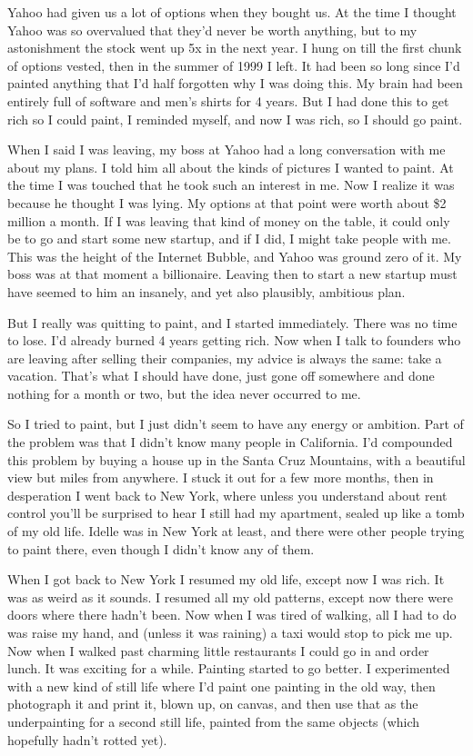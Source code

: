 Yahoo had given us a lot of options when they bought us. At the time I
thought Yahoo was so overvalued that they'd never be worth anything, but
to my astonishment the stock went up 5x in the next year. I hung on till
the first chunk of options vested, then in the summer of 1999 I left. It
had been so long since I'd painted anything that I'd half forgotten why
I was doing this. My brain had been entirely full of software and men's
shirts for 4 years. But I had done this to get rich so I could paint, I
reminded myself, and now I was rich, so I should go paint.

When I said I was leaving, my boss at Yahoo had a long conversation with
me about my plans. I told him all about the kinds of pictures I wanted
to paint. At the time I was touched that he took such an interest in me.
Now I realize it was because he thought I was lying. My options at that
point were worth about \$2 million a month. If I was leaving that kind
of money on the table, it could only be to go and start some new
startup, and if I did, I might take people with me. This was the height
of the Internet Bubble, and Yahoo was ground zero of it. My boss was at
that moment a billionaire. Leaving then to start a new startup must have
seemed to him an insanely, and yet also plausibly, ambitious plan.

But I really was quitting to paint, and I started immediately. There was
no time to lose. I'd already burned 4 years getting rich. Now when I
talk to founders who are leaving after selling their companies, my
advice is always the same: take a vacation. That's what I should have
done, just gone off somewhere and done nothing for a month or two, but
the idea never occurred to me.

So I tried to paint, but I just didn't seem to have any energy or
ambition. Part of the problem was that I didn't know many people in
California. I'd compounded this problem by buying a house up in the
Santa Cruz Mountains, with a beautiful view but miles from anywhere. I
stuck it out for a few more months, then in desperation I went back to
New York, where unless you understand about rent control you'll be
surprised to hear I still had my apartment, sealed up like a tomb of my
old life. Idelle was in New York at least, and there were other people
trying to paint there, even though I didn't know any of them.

When I got back to New York I resumed my old life, except now I was
rich. It was as weird as it sounds. I resumed all my old patterns,
except now there were doors where there hadn't been. Now when I was
tired of walking, all I had to do was raise my hand, and (unless it was
raining) a taxi would stop to pick me up. Now when I walked past
charming little restaurants I could go in and order lunch. It was
exciting for a while. Painting started to go better. I experimented with
a new kind of still life where I'd paint one painting in the old way,
then photograph it and print it, blown up, on canvas, and then use that
as the underpainting for a second still life, painted from the same
objects (which hopefully hadn't rotted yet).

